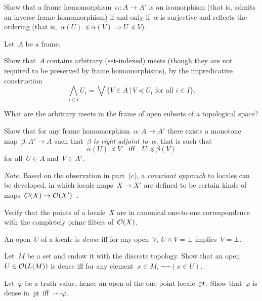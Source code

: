 \documentclass{ws-rv9x6}
\begin{document}
{\begin{exercise}%
\label{ex:isomorphisms-of-frames}%
Show that a frame homomorphism~$\alpha : A \to A'$ is an isomorphism (that is,
admits an inverse frame homomorphism) if and only if~$\alpha$ is surjective and
reflects the ordering (that is,~$\alpha(U) \preceq \alpha(V) \Rightarrow U
\preceq V$).
\end{exercise}

\begin{exercise}%
Let~$A$ be a frame.
\begin{alphlist}[(c)]
\item Show that~$A$ contains arbitrary (set-indexed) meets (though they are not
required to be preserved by frame homomorphisms), by the impredicative
construction
\[ \bigwedge_{i \in I} U_i = \bigvee\{ V \in A \,|\, \text{$V \preceq U_i$ for all~$i \in I$}
\}. \]
\item What are the arbitrary meets in the frame of open subsets of a
topological space?
\item Show that for any frame homomorphism~$\alpha : A \to A'$ there exists a
monotone map~$\beta : A' \to A$ such that~\emph{$\beta$ is right adjoint
to~$\alpha$}, that is such that
\[ \alpha(U) \preceq V \quad\text{iff}\quad U \preceq \beta(V) \]
for all~$U \in A$ and~$V \in A'$.
\end{alphlist}
{\scriptsize\emph{Note.} Based on the observation in part~(c), a
\emph{covariant approach} to locales can be developed, in which locale maps~$X
\to X'$ are defined to be certain kinds of maps~$\mathcal{O}(X) \to
\mathcal{O}(X')$~\cite{picado-pultr:covariant}.\par}
\end{exercise}

\begin{exercise}%
\label{ex:points-as-filters}%
Verify that the points of a locale~$X$ are in canonical one-to-one correspondence
with the completely prime filters of~$\mathcal{O}(X)$.
\end{exercise}

\begin{exercise}%
\label{ex:dense-opens}%
An open~$U$ of a locale is \emph{dense} iff for any open~$V$, $U \wedge V =
\bot$ implies~$V = \bot$.
\begin{alphlist}[(b)]
\item Let~$M$ be a set and endow it with the discrete topology. Show that an
open~$U \in \mathcal{O}(L(M))$ is dense iff for any element~$x \in M$, $\neg\neg(x \in
U)$.
\item Let~$\varphi$ be a truth value, hence an open of the one-point
locale~$\mathrm{pt}$. Show that~$\varphi$ is dense in~$\mathrm{pt}$ iff~$\neg\neg\varphi$.
\end{alphlist}
\end{exercise}

}
\end{document}
